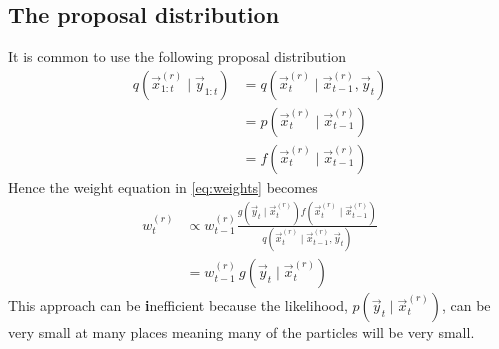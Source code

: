 \subsection{The proposal distribution}
    It is common to use the following proposal distribution
    \begin{align}
        q\left(\vec x_{1:t}^{(r)} \mid \vec y_{1:t}\right)  &= q\left(\vec x_t^{(r)} \mid \vec x_{t - 1}^{(r)}, \vec y_t\right) \\
                                                            &= p\left(\vec x_t^{(r)} \mid \vec x_{t - 1}^{(r)}\right) \\
                                                            &= f\left(\vec x_t^{(r)} \mid \vec x_{t - 1}^{(r)}\right)
    \end{align}
    Hence the weight equation in \eqref{eq:weights} becomes
    \begin{align}
        w_t^{(r)}   &\propto w_{t - 1}^{(r)} \frac{g\left(\vec y_t \mid \vec x_t^{(r)}\right) f\left(\vec x_t^{(r)} \mid \vec x_{t - 1}^{(r)}\right)}{q\left(\vec x_t^{(r)} \mid \vec x_{t - 1}^{(r)}, \vec y_t\right)} \\
                    &= w_{t - 1}^{(r)}\, g\left(\vec y_t \mid \vec x_t^{(r)}\right)
    \end{align}
    This approach can be \textbf inefficient because the likelihood, $p\left(\vec y_t \mid \vec x_t^{(r)}\right)$, can be very small at many places meaning many of the particles will be very small.

